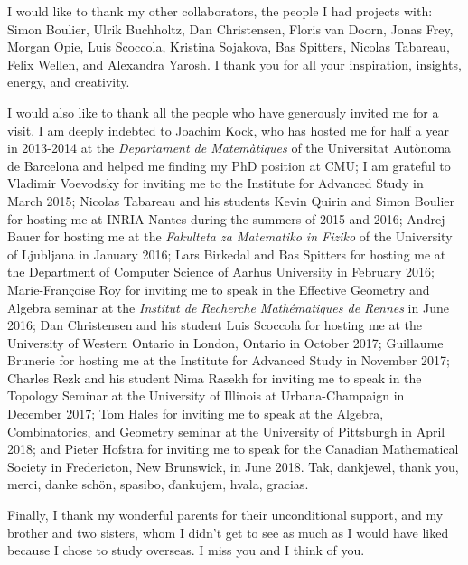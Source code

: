 I would like to thank my other collaborators, the people I had projects with:
Simon Boulier, Ulrik Buchholtz, Dan Christensen, Floris van Doorn, Jonas Frey, Morgan Opie, Luis Scoccola, Kristina Sojakova, Bas Spitters, Nicolas Tabareau, Felix Wellen, and Alexandra Yarosh. I thank you for all your inspiration, insights, energy, and creativity.

I would also like to thank all the people who have generously invited me for a visit. I am deeply indebted to Joachim Kock, who has hosted me for half a year in 2013-2014 at the \textit{Departament de Matemàtiques} of the Universitat Autònoma de Barcelona and helped me finding my PhD position at CMU; I am grateful to Vladimir Voevodsky for inviting me to the Institute for Advanced Study in March 2015; Nicolas Tabareau and his students Kevin Quirin and Simon Boulier for hosting me at INRIA Nantes during the summers of 2015 and 2016; Andrej Bauer for hosting me at the \textit{Fakulteta za Matematiko in Fiziko} of the University of Ljubljana in January 2016; Lars Birkedal and Bas Spitters for hosting me at the Department of Computer Science of Aarhus University in February 2016; Marie-Françoise Roy for inviting me to speak in the Effective Geometry and Algebra seminar at the \textit{Institut de Recherche Mathématiques de Rennes} in June 2016; Dan Christensen and his student Luis Scoccola for hosting me at the University of Western Ontario in London, Ontario in October 2017; Guillaume Brunerie for hosting me at the Institute for Advanced Study in November 2017; Charles Rezk and his student Nima Rasekh for inviting me to speak in the Topology Seminar at the University of Illinois at Urbana-Champaign in December 2017; Tom Hales for inviting me to speak at the Algebra, Combinatorics, and Geometry seminar at the University of Pittsburgh in April 2018; and Pieter Hofstra for inviting me to speak for the Canadian Mathematical Society in Fredericton, New Brunswick, in June 2018. Tak, dankjewel, thank you, merci, danke sch\"on, spasibo, \v dankujem, hvala, gracias.

Finally, I thank my wonderful parents for their unconditional support, and my brother and two sisters, whom I didn't get to see as much as I would have liked because I chose to study overseas. I miss you and I think of you.
